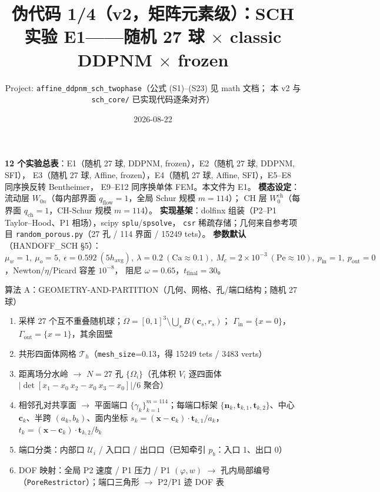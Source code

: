 \documentclass[11pt]{article}
\title{\bfseries 伪代码 1/4（v2，矩阵元素级）：SCH 实验 E1——随机 27 球 $\times$ classic DDPNM $\times$ frozen}
\author{Project: \texttt{affine\_ddpnm\_sch\_twophase}（公式 (S1)--(S23) 见 math 文档；
本 v2 与 \texttt{sch\_core/} 已实现代码逐条对齐）}
\date{2026-08-22}
\newcommand{\code}[1]{\texttt{#1}}
\newcommand{\iface}{\gamma}
\newenvironment{pseudo}[1]{\begin{algobox}{#1}%
  \begin{enumerate}[label={\ttfamily\arabic*}, leftmargin=3.4em, itemsep=1.5pt, topsep=1pt, parsep=0pt]}%
  {\end{enumerate}\end{algobox}}
\begin{document}
\maketitle

\noindent\textbf{12 个实验总表}：E1（随机 27 球, DDPNM, frozen），E2（随机 27 球, DDPNM, SFI），
E3（随机 27 球, Affine, frozen），E4（随机 27 球, Affine, SFI），E5--E8 同序换反转 Bentheimer，
E9--E12 同序换单体 FEM。本文件为 E1。
\textbf{模态设定}：流动层 $W_{0n}$（每内部界面 $q_{\mathrm{flow}}=1$，全局 Schur 规模 $m=114$）；
CH 层 $W^{\mathrm{ch}}_0$（每界面 $q_{\mathrm{ch}}=1$，CH-Schur 规模 $m=114$）。
\textbf{实现基架}：dolfinx 组装（P2--P1 Taylor--Hood、P1 相场），scipy \code{splu}/\code{spsolve}，
\code{csr} 稀疏存储；几何来自参考项目 \code{random\_porous.py}（27 孔 / 114 界面 / 15249 tets）。
\textbf{参数默认}（HANDOFF\_SCH §5）：$\mu_w=1,\ \mu_o=5,\ \epsilon=0.592\ (5h_{\mathrm{avg}}),\
\lambda=0.2\ (\mathrm{Ca}\approx0.1),\ M_c=2\times10^{-3}\ (\mathrm{Pe}\approx10),\
p_{\mathrm{in}}=1,\ p_{\mathrm{out}}=0$，Newton/$\eta$/Picard 容差 $10^{-8}$，
阻尼 $\omega=0.65$，$t_{\mathrm{final}}=30$。

\begin{pseudo}{算法 A：GEOMETRY-AND-PARTITION（几何、网格、孔/端口结构；随机 27 球）}
\item 采样 27 个互不重叠随机球；$\Omega=[0,1]^3\setminus\bigcup_sB(\bm c_s,r_s)$；
$\Gamma_{\mathrm{in}}=\{x=0\}$，$\Gamma_{\mathrm{out}}=\{x=1\}$，其余固壁
\item 共形四面体网格 $\mathcal T_h$（\code{mesh\_size}=0.13，得 15249 tets / 3483 verts）
\item 距离场分水岭 $\to$ $N=27$ 孔 $\{\Omega_i\}$（孔体积 $V_i$ 逐四面体
$|\det[x_1{-}x_0\ x_2{-}x_0\ x_3{-}x_0]|/6$ 聚合）
\item 相邻孔对共享面 $\to$ 平面端口 $\{\iface_k\}_{k=1}^{m=114}$；每端口标架
$\{\bm n_k,\bm t_{k,1},\bm t_{k,2}\}$、中心 $\bm c_k$、半跨 $(a_k,b_k)$、面内坐标
$s_k=(\bm x-\bm c_k)\!\cdot\!\bm t_{k,1}/a_k$，$t_k=(\bm x-\bm c_k)\!\cdot\!\bm t_{k,2}/b_k$
\item 端口分类：内部口 $\mathcal U_i$ / 入口口 / 出口口（已知牵引 $p_b$：入口 1、出口 0）
\item DOF 映射：全局 P2 速度 / P1 压力 / P1 $(\varphi,w)$ $\to$ 孔内局部编号
（\code{PoreRestrictor}）；端口三角形 $\to$ P2/P1 迹 DOF 表
\end{pseudo}
\end{document}
